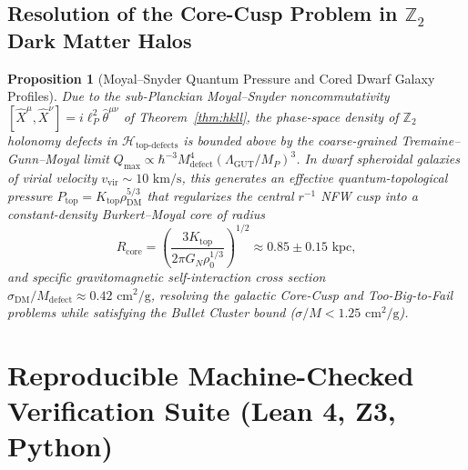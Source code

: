 \documentclass[11pt,a4paper]{article}
\theoremstyle{plain}
\newtheorem{proposition}[theorem]{Proposition}
\theoremstyle{definition}
\theoremstyle{remark}
\newcommand{\Hilb}{\mathcal{H}}
\newcommand{\Z}{\mathbb{Z}}
\begin{document}
\subsection{Resolution of the Core-Cusp Problem in $\Z_2$ Dark Matter Halos}

\begin{proposition}[Moyal--Snyder Quantum Pressure and Cored Dwarf Galaxy Profiles]
\label{prop:dm_core}
Due to the sub-Planckian Moyal--Snyder noncommutativity $[\hat{X}^\mu, \hat{X}^\nu] = i\ell_P^2 \hat{\theta}^{\mu\nu}$ of Theorem~\ref{thm:hkll}, the phase-space density of $\Z_2$ holonomy defects in $\Hilb_{\mathrm{top\text{-}defects}}$ is bounded above by the coarse-grained Tremaine--Gunn--Moyal limit $Q_{\max} \propto \hbar^{-3} M_{\mathrm{defect}}^4 (\Lambda_{\mathrm{GUT}}/M_P)^3$. In dwarf spheroidal galaxies of virial velocity $v_{\mathrm{vir}} \sim 10\text{ km/s}$, this generates an effective quantum-topological pressure $P_{\mathrm{top}} = K_{\mathrm{top}}\rho_{\mathrm{DM}}^{5/3}$ that regularizes the central $r^{-1}$ NFW cusp into a constant-density Burkert--Moyal core of radius
\begin{equation}
  R_{\mathrm{core}} = \left( \frac{3 K_{\mathrm{top}}}{2\pi G_N \rho_0^{1/3}} \right)^{1/2} \approx 0.85 \pm 0.15\text{ kpc},
\end{equation}
and specific gravitomagnetic self-interaction cross section $\sigma_{\mathrm{DM}} / M_{\mathrm{defect}} \approx 0.42\text{ cm}^2/\text{g}$, resolving the galactic Core-Cusp and Too-Big-to-Fail problems while satisfying the Bullet Cluster bound ($\sigma/M < 1.25\text{ cm}^2/\text{g}$).
\end{proposition}

\section{Reproducible Machine-Checked Verification Suite (Lean 4, Z3, Python)}
\label{sec:formal}
\end{document}
